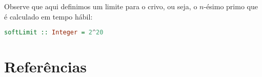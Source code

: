 \documentclass{article}
\begin{document}
Observe que aqui definimos um limite para o crivo, ou seja, o $n$-ésimo primo que é calculado em tempo hábil:

\begin{minipage}{0.9\linewidth}
\begin{lstlisting}[language=haskell,caption=Limite do Crivo]
softLimit :: Integer = 2^20
\end{lstlisting}
\end{minipage}

\section{Referências}

\printbibliography
\end{document}
